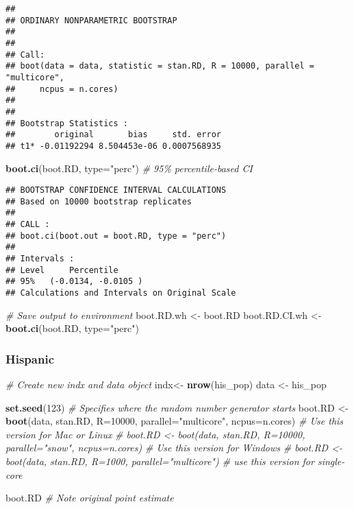 \documentclass[
]{article}
\newenvironment{Shaded}{\begin{snugshade}}{\end{snugshade}}
\newcommand{\AttributeTok}[1]{\textcolor[rgb]{0.13,0.29,0.53}{#1}}
\newcommand{\CommentTok}[1]{\textcolor[rgb]{0.56,0.35,0.01}{\textit{#1}}}
\newcommand{\DecValTok}[1]{\textcolor[rgb]{0.00,0.00,0.81}{#1}}
\newcommand{\FunctionTok}[1]{\textcolor[rgb]{0.13,0.29,0.53}{\textbf{#1}}}
\newcommand{\NormalTok}[1]{#1}
\newcommand{\OtherTok}[1]{\textcolor[rgb]{0.56,0.35,0.01}{#1}}
\newcommand{\StringTok}[1]{\textcolor[rgb]{0.31,0.60,0.02}{#1}}
\begin{document}
\begin{verbatim}
## 
## ORDINARY NONPARAMETRIC BOOTSTRAP
## 
## 
## Call:
## boot(data = data, statistic = stan.RD, R = 10000, parallel = "multicore", 
##     ncpus = n.cores)
## 
## 
## Bootstrap Statistics :
##        original       bias     std. error
## t1* -0.01192294 8.504453e-06 0.0007568935
\end{verbatim}

\begin{Shaded}
\begin{Highlighting}[]
\FunctionTok{boot.ci}\NormalTok{(boot.RD, }\AttributeTok{type=}\StringTok{"perc"}\NormalTok{) }\CommentTok{\# 95\% percentile{-}based CI}
\end{Highlighting}
\end{Shaded}

\begin{verbatim}
## BOOTSTRAP CONFIDENCE INTERVAL CALCULATIONS
## Based on 10000 bootstrap replicates
## 
## CALL : 
## boot.ci(boot.out = boot.RD, type = "perc")
## 
## Intervals : 
## Level     Percentile     
## 95%   (-0.0134, -0.0105 )  
## Calculations and Intervals on Original Scale
\end{verbatim}

\begin{Shaded}
\begin{Highlighting}[]
\CommentTok{\# Save output to environment}
\NormalTok{boot.RD.wh }\OtherTok{\textless{}{-}}\NormalTok{ boot.RD}
\NormalTok{boot.RD.CI.wh }\OtherTok{\textless{}{-}} \FunctionTok{boot.ci}\NormalTok{(boot.RD, }\AttributeTok{type=}\StringTok{"perc"}\NormalTok{) }
\end{Highlighting}
\end{Shaded}

\subsubsection{Hispanic}\label{hispanic}

\begin{Shaded}
\begin{Highlighting}[]
\CommentTok{\# Create new indx and data object }
\NormalTok{indx}\OtherTok{\textless{}{-}} \FunctionTok{nrow}\NormalTok{(his\_pop)}
\NormalTok{data }\OtherTok{\textless{}{-}}\NormalTok{ his\_pop}

\FunctionTok{set.seed}\NormalTok{(}\DecValTok{123}\NormalTok{) }\CommentTok{\# Specifies where the random number generator starts}
\NormalTok{boot.RD }\OtherTok{\textless{}{-}} \FunctionTok{boot}\NormalTok{(data, stan.RD, }\AttributeTok{R=}\DecValTok{10000}\NormalTok{, }\AttributeTok{parallel=}\StringTok{"multicore"}\NormalTok{, }\AttributeTok{ncpus=}\NormalTok{n.cores) }\CommentTok{\# Use this version for Mac or Linux}
\CommentTok{\# boot.RD \textless{}{-} boot(data, stan.RD, R=10000, parallel="snow", ncpus=n.cores) \# Use this version for Windows}
\CommentTok{\# boot.RD \textless{}{-} boot(data, stan.RD, R=1000, parallel="multicore") \# use this version for single{-}core}

\NormalTok{boot.RD }\CommentTok{\# Note original point estimate}
\end{Highlighting}
\end{Shaded}
\end{document}
